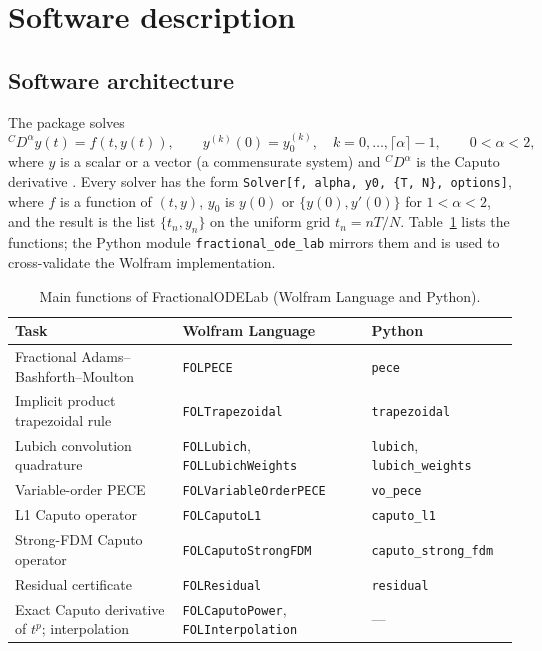 \documentclass[11pt]{article}
\begin{document}
\section{Software description}
\subsection{Software architecture}
The package solves
\begin{equation}\label{eq:ivp}
{}^{C}\!D^{\alpha}y(t)=f(t,y(t)),\qquad y^{(k)}(0)=y_0^{(k)},\quad k=0,\dots,\lceil\alpha\rceil-1,\qquad 0<\alpha<2,
\end{equation}
where $y$ is a scalar or a vector (a commensurate system) and ${}^{C}\!D^{\alpha}$ is the Caputo derivative \cite{podlubny,diethelmbook}. Every solver has the form \texttt{Solver[f, alpha, y0, \{T, N\}, options]}, where $f$ is a function of $(t,y)$, $y_0$ is $y(0)$ or $\{y(0),y'(0)\}$ for $1<\alpha<2$, and the result is the list $\{t_n,y_n\}$ on the uniform grid $t_n=nT/N$. Table~\ref{tab:api} lists the functions; the Python module \texttt{fractional\_ode\_lab} mirrors them and is used to cross-validate the Wolfram implementation.

\begin{table}[H]\centering\footnotesize
\caption{Main functions of FractionalODELab (Wolfram Language and Python).}\label{tab:api}
\begin{tabular}{@{}lll@{}}\toprule
Task & Wolfram Language & Python\\\midrule
Fractional Adams--Bashforth--Moulton & \texttt{FOLPECE} & \texttt{pece}\\
Implicit product trapezoidal rule & \texttt{FOLTrapezoidal} & \texttt{trapezoidal}\\
Lubich convolution quadrature & \texttt{FOLLubich}, \texttt{FOLLubichWeights} & \texttt{lubich}, \texttt{lubich\_weights}\\
Variable-order PECE & \texttt{FOLVariableOrderPECE} & \texttt{vo\_pece}\\
L1 Caputo operator & \texttt{FOLCaputoL1} & \texttt{caputo\_l1}\\
Strong-FDM Caputo operator & \texttt{FOLCaputoStrongFDM} & \texttt{caputo\_strong\_fdm}\\
Residual certificate & \texttt{FOLResidual} & \texttt{residual}\\
Exact Caputo derivative of $t^p$; interpolation & \texttt{FOLCaputoPower}, \texttt{FOLInterpolation} & ---\\\bottomrule
\end{tabular}\end{table}
\end{document}
